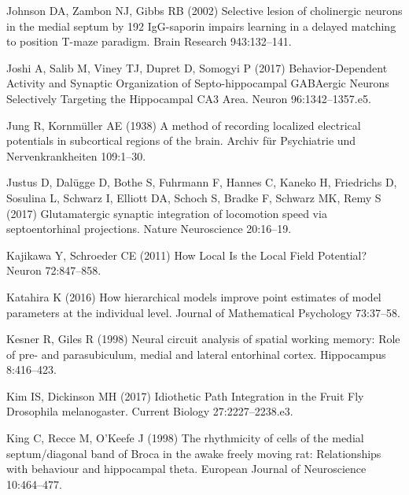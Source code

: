 \documentclass[
  12pt,
  a4paper,
  openany]{book}
\newlength{\cslhangindent}
\newlength{\cslentryspacingunit} %
\newenvironment{CSLReferences}[2] %
 {%
  \setlength{\parindent}{0pt}
  \ifodd #1
  \let\oldpar\par
  \def\par{\hangindent=\cslhangindent\oldpar}
  \fi
  \setlength{\parskip}{#2\cslentryspacingunit}
 }%
 {}
\begin{document}
\begin{CSLReferences}{1}{0}
\leavevmode{}%
Johnson DA, Zambon NJ, Gibbs RB (2002) Selective lesion of cholinergic neurons in the medial septum by 192 {IgG}-saporin impairs learning in a delayed matching to position {T}-maze paradigm. Brain Research 943:132--141.

\leavevmode{}%
Joshi A, Salib M, Viney TJ, Dupret D, Somogyi P (2017) Behavior-{Dependent} {Activity} and {Synaptic} {Organization} of {Septo}-hippocampal {GABAergic} {Neurons} {Selectively} {Targeting} the {Hippocampal} {CA3} {Area}. Neuron 96:1342--1357.e5.

\leavevmode{}%
Jung R, Kornmüller AE (1938) A method of recording localized electrical potentials in subcortical regions of the brain. Archiv f{ü}r Psychiatrie und Nervenkrankheiten 109:1--30.

\leavevmode{}%
Justus D, Dalügge D, Bothe S, Fuhrmann F, Hannes C, Kaneko H, Friedrichs D, Sosulina L, Schwarz I, Elliott DA, Schoch S, Bradke F, Schwarz MK, Remy S (2017) Glutamatergic synaptic integration of locomotion speed via septoentorhinal projections. Nature Neuroscience 20:16--19.

\leavevmode{}%
Kajikawa Y, Schroeder CE (2011) How {Local} {Is} the {Local} {Field} {Potential}? Neuron 72:847--858.

\leavevmode{}%
Katahira K (2016) How hierarchical models improve point estimates of model parameters at the individual level. Journal of Mathematical Psychology 73:37--58.

\leavevmode{}%
Kesner R, Giles R (1998) Neural circuit analysis of spatial working memory: {Role} of pre- and parasubiculum, medial and lateral entorhinal cortex. Hippocampus 8:416--423.

\leavevmode{}%
Kim IS, Dickinson MH (2017) Idiothetic {Path} {Integration} in the {Fruit} {Fly} {Drosophila} melanogaster. Current Biology 27:2227--2238.e3.

\leavevmode{}%
King C, Recce M, O'Keefe J (1998) The rhythmicity of cells of the medial septum/diagonal band of {Broca} in the awake freely moving rat: Relationships with behaviour and hippocampal theta. European Journal of Neuroscience 10:464--477.


\end{CSLReferences}
\end{document}
